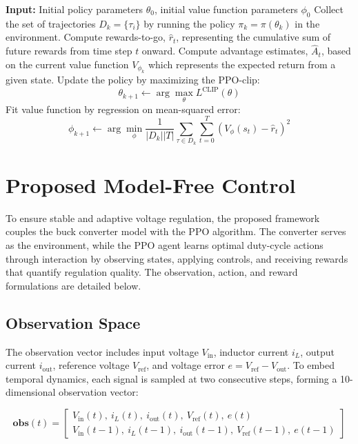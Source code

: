 \documentclass[conference]{IEEEtran}
\begin{document}
\begin{algorithm}[!t]
\caption{PPO-clipped}
\label{alg:ppo}
\begin{algorithmic}[1]
\State \textbf{Input:} Initial policy parameters $\theta_0$, initial value function parameters $\phi_0$
    \State Collect the set of trajectories $D_k = \{\tau_i\}$ by running the policy $\pi_k = \pi(\theta_k)$ in the environment.
    \State Compute rewards-to-go, $\hat{r}_t$, representing the cumulative sum of future rewards from time step $t$ onward.
    \State Compute advantage estimates, $\hat{A}_t$, based on the current value function $V_{\phi_k}$ which represents the expected return from a given state.
    \State Update the policy by maximizing the PPO-clip:
    \[
        \theta_{k+1} \leftarrow \arg\max_\theta L^{\text{CLIP}}(\theta)
    \]
   \State Fit value function by regression on mean-squared error:
    \[
        \phi_{k+1} \leftarrow \arg\min_\phi \frac{1}{|D_k||T|} \sum_{\tau \in D_k} \sum_{t=0}^{T} \left( V_\phi(s_t) - \hat{r}_t \right)^2
   \]
\EndFor
\end{algorithmic}
\end{algorithm}


\section{Proposed Model-Free Control}

To ensure stable and adaptive voltage regulation, the proposed framework couples the buck converter model with the PPO algorithm. The converter serves as the environment, while the PPO agent learns optimal duty-cycle actions through interaction by observing states, applying controls, and receiving rewards that quantify regulation quality. The observation, action, and reward formulations are detailed below.


\subsection{Observation Space}

The observation vector includes input voltage $V_{\text{in}}$, inductor current $i_L$, output current $i_{\text{out}}$, reference voltage $V_{\text{ref}}$, and voltage error $e = V_{\text{ref}} - V_{\text{out}}$. To embed temporal dynamics, each signal is sampled at two consecutive steps, forming a 10-dimensional observation vector:


\begin{equation}
\mathbf{obs}(t) =
\begin{bmatrix}
V_{\text{in}}(t),\ i_L(t),\ i_{\text{out}}(t),\ V_{\text{ref}}(t),\ e(t) \\
V_{\text{in}}(t{-}1),\ i_L(t{-}1),\ i_{\text{out}}(t{-}1),\ V_{\text{ref}}(t{-}1),\ e(t{-}1)
\end{bmatrix}
\label{eq:obs_vector}
\end{equation}
\end{document}
